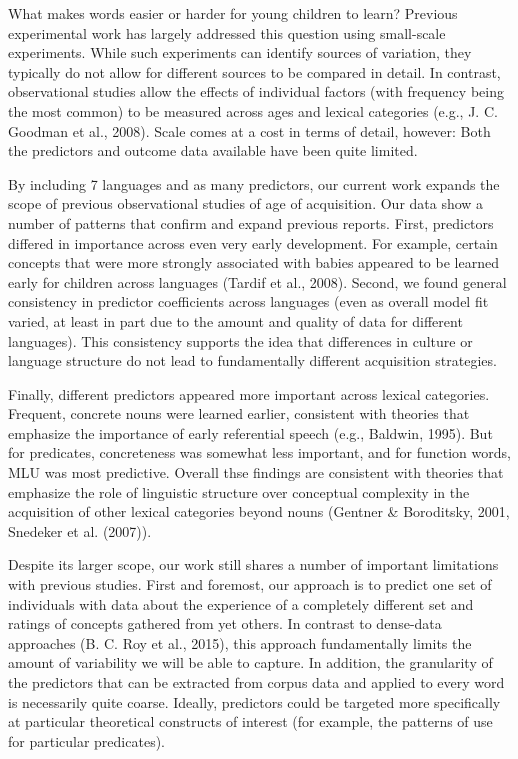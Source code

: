\documentclass[10pt, letterpaper]{article}
\begin{document}
What makes words easier or harder for young children to learn? Previous
experimental work has largely addressed this question using small-scale
experiments. While such experiments can identify sources of variation,
they typically do not allow for different sources to be compared in
detail. In contrast, observational studies allow the effects of
individual factors (with frequency being the most common) to be measured
across ages and lexical categories (e.g., J. C. Goodman et al., 2008).
Scale comes at a cost in terms of detail, however: Both the predictors
and outcome data available have been quite limited.

By including 7 languages and as many predictors, our current work
expands the scope of previous observational studies of age of
acquisition. Our data show a number of patterns that confirm and expand
previous reports. First, predictors differed in importance across even
very early development. For example, certain concepts that were more
strongly associated with babies appeared to be learned early for
children across languages (Tardif et al., 2008). Second, we found
general consistency in predictor coefficients across languages (even as
overall model fit varied, at least in part due to the amount and quality
of data for different languages). This consistency supports the idea
that differences in culture or language structure do not lead to
fundamentally different acquisition strategies.

Finally, different predictors appeared more important across lexical
categories. Frequent, concrete nouns were learned earlier, consistent
with theories that emphasize the importance of early referential speech
(e.g., Baldwin, 1995). But for predicates, concreteness was somewhat
less important, and for function words, MLU was most predictive. Overall
thse findings are consistent with theories that emphasize the role of
linguistic structure over conceptual complexity in the acquisition of
other lexical categories beyond nouns (Gentner \& Boroditsky, 2001,
Snedeker et al. (2007)).

Despite its larger scope, our work still shares a number of important
limitations with previous studies. First and foremost, our approach is
to predict one set of individuals with data about the experience of a
completely different set and ratings of concepts gathered from yet
others. In contrast to dense-data approaches (B. C. Roy et al., 2015),
this approach fundamentally limits the amount of variability we will be
able to capture. In addition, the granularity of the predictors that can
be extracted from corpus data and applied to every word is necessarily
quite coarse. Ideally, predictors could be targeted more specifically at
particular theoretical constructs of interest (for example, the patterns
of use for particular predicates).
\end{document}
